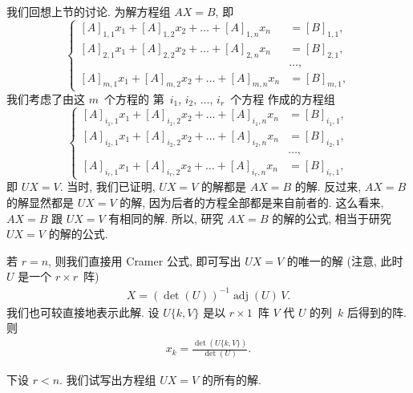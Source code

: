 \documentclass[../libro.tex]{subfiles}
\begin{document}
我们回想上节的讨论.
为解方程组 \(AX = B\), 即
\begin{equation*}
    \left\{ %
    \begin{aligned}
        [A]_{1,1} x_1 + [A]_{1,2} x_2 + \dots + [A]_{1,n} x_n & = [B]_{1,1}, \\
        [A]_{2,1} x_1 + [A]_{2,2} x_2 + \dots + [A]_{2,n} x_n & = [B]_{2,1}, \\
        & \dots, \\
        [A]_{m,1} x_1 + [A]_{m,2} x_2 + \dots + [A]_{m,n} x_n & = [B]_{m,1},
    \end{aligned}
    \right. %
\end{equation*}
我们考虑了由这 \(m\)~个方程的%
第~\(i_1\), \(i_2\), \(\dots\), \(i_r\)~个方程%
作成的方程组
\begin{equation*}
    \left\{ %
    \begin{aligned}
        [A]_{i_1,1} x_1 + [A]_{i_1,2} x_2 + \dots + [A]_{i_1,n} x_n & = [B]_{i_1,1}, \\
        [A]_{i_2,1} x_1 + [A]_{i_2,2} x_2 + \dots + [A]_{i_2,n} x_n & = [B]_{i_2,1}, \\
        & \dots, \\
        [A]_{i_r,1} x_1 + [A]_{i_r,2} x_2 + \dots + [A]_{i_r,n} x_n & = [B]_{i_r,1},
    \end{aligned}
    \right. %
\end{equation*}
即 \(UX = V\).
当时, 我们已证明,
\(UX = V\) 的解都是 \(AX = B\) 的解.
反过来, \(AX = B\) 的解显然都是 \(UX = V\) 的解,
因为后者的方程全部都是来自前者的.
这么看来, \(AX = B\) 跟 \(UX = V\) 有相同的解.
所以, 研究 \(AX = B\) 的解的公式,
相当于研究 \(UX = V\) 的解的公式.

若 \(r = n\),
则我们直接用 Cramer 公式,
即可写出 \(UX = V\) 的唯一的解
(注意, 此时 \(U\) 是一个 \(r \times r\)~阵)
\begin{align*}
    X = (\det {(U)})^{-1} \operatorname{adj} {(U)}\,V.
\end{align*}
我们也可较直接地表示此解.
设 \(U\{k,V\}\) 是以 \(r \times 1\)~阵 \(V\)
代 \(U\) 的列~\(k\) 后得到的阵.
则
\begin{align*}
    x_k = \frac{\det {(U\{k,V\})}}{\det {(U)}}.
\end{align*}

下设 \(r < n\).
我们试写出方程组 \(UX = V\) 的所有的解.
\end{document}

